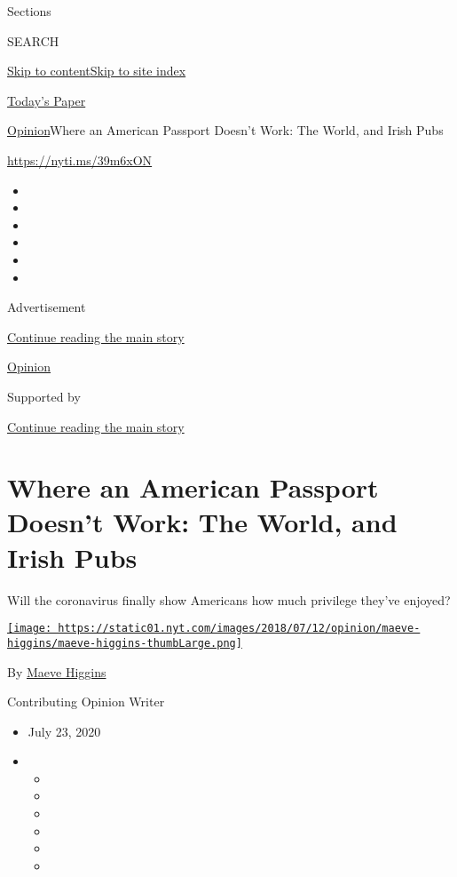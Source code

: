 Sections

SEARCH

\protect\hyperlink{site-content}{Skip to
content}\protect\hyperlink{site-index}{Skip to site index}

\href{https://myaccount.nytimes.com/auth/login?response_type=cookie\&client_id=vi}{}

\href{https://www.nytimes.com/section/todayspaper}{Today's Paper}

\href{/section/opinion}{Opinion}\textbar{}Where an American Passport
Doesn't Work: The World, and Irish Pubs

\href{https://nyti.ms/39m6xON}{https://nyti.ms/39m6xON}

\begin{itemize}
\item
\item
\item
\item
\item
\item
\end{itemize}

Advertisement

\protect\hyperlink{after-top}{Continue reading the main story}

\href{/section/opinion}{Opinion}

Supported by

\protect\hyperlink{after-sponsor}{Continue reading the main story}

\hypertarget{where-an-american-passport-doesnt-work-the-world-and-irish-pubs}{%
\section{Where an American Passport Doesn't Work: The World, and Irish
Pubs}\label{where-an-american-passport-doesnt-work-the-world-and-irish-pubs}}

Will the coronavirus finally show Americans how much privilege they've
enjoyed?

\href{https://www.nytimes.com/by/maeve-higgins}{\texttt{[image: https://static01.nyt.com/images/2018/07/12/opinion/maeve-higgins/maeve-higgins-thumbLarge.png]}}

By \href{https://www.nytimes.com/by/maeve-higgins}{Maeve Higgins}

Contributing Opinion Writer

\begin{itemize}
\item
  July 23, 2020
\item
  \begin{itemize}
  \item
  \item
  \item
  \item
  \item
  \item
  \end{itemize}
\end{itemize}

